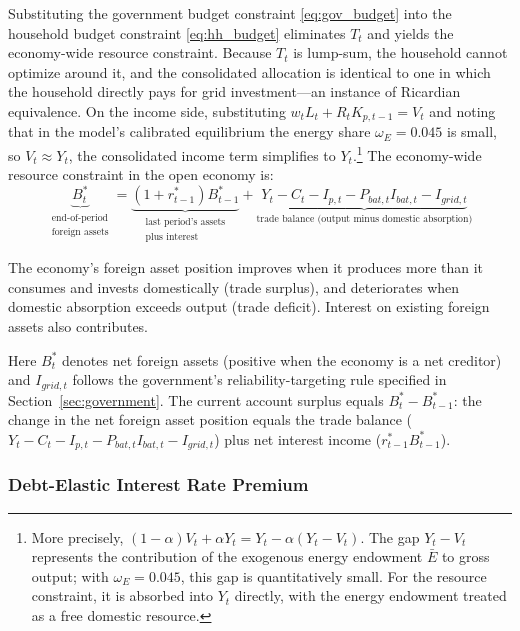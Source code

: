 \documentclass[12pt, a4paper]{article}
\begin{document}
Substituting the government budget constraint \eqref{eq:gov_budget} into the household budget constraint \eqref{eq:hh_budget} eliminates $T_t$ and yields the economy-wide resource constraint. Because $T_t$ is lump-sum, the household cannot optimize around it, and the consolidated allocation is identical to one in which the household directly pays for grid investment---an instance of Ricardian equivalence. On the income side, substituting $w_t L_t + R_t K_{p,t-1} = V_t$ and noting that in the model's calibrated equilibrium the energy share $\omega_E = 0.045$ is small, so $V_t \approx Y_t$, the consolidated income term simplifies to $Y_t$.\footnote{More precisely, $(1-\alpha)V_t + \alpha Y_t = Y_t - \alpha(Y_t - V_t)$. The gap $Y_t - V_t$ represents the contribution of the exogenous energy endowment $\bar{E}$ to gross output; with $\omega_E = 0.045$, this gap is quantitatively small. For the resource constraint, it is absorbed into $Y_t$ directly, with the energy endowment treated as a free domestic resource.} The economy-wide resource constraint in the open economy is:
\begin{equation}
\underbrace{B^*_t}_{\substack{\text{end-of-period}\\\text{foreign assets}}} = \underbrace{(1 + r^*_{t-1}) B^*_{t-1}}_{\substack{\text{last period's assets}\\\text{plus interest}}} + \underbrace{Y_t - C_t - I_{p,t} - P_{bat,t} I_{bat,t} - I_{grid,t}}_{\text{trade balance (output minus domestic absorption)}}
\label{eq:current_account}
\end{equation}

The economy's foreign asset position improves when it produces more than it consumes and invests domestically (trade surplus), and deteriorates when domestic absorption exceeds output (trade deficit). Interest on existing foreign assets also contributes.

Here $B^*_t$ denotes net foreign assets (positive when the economy is a net creditor) and $I_{grid,t}$ follows the government's reliability-targeting rule specified in Section~\ref{sec:government}. The current account surplus equals $B^*_t - B^*_{t-1}$: the change in the net foreign asset position equals the trade balance ($Y_t - C_t - I_{p,t} - P_{bat,t} I_{bat,t} - I_{grid,t}$) plus net interest income ($r^*_{t-1} B^*_{t-1}$).

\subsubsection{Debt-Elastic Interest Rate Premium}
\end{document}
